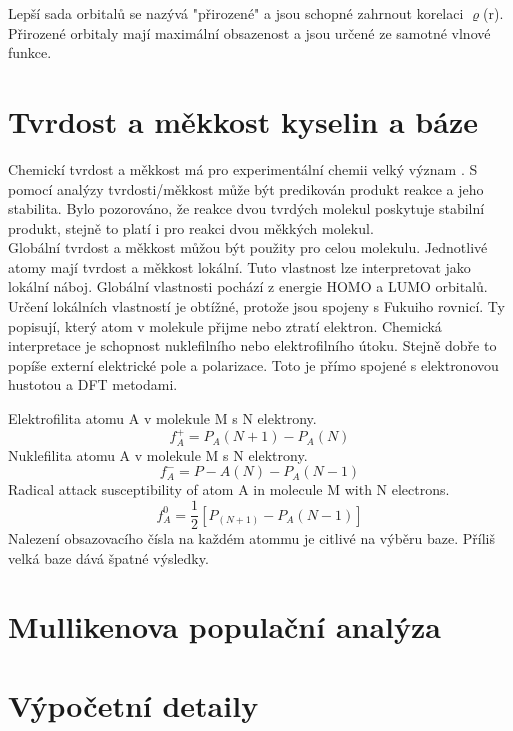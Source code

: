 \documentclass[
  digital, %
  table,   %
  lof,     %
  lot,     %
]{fithesis3}
\begin{document}
Lepší sada orbitalů se nazývá "přirozené" a jsou schopné zahrnout korelaci $\varrho$(r). Přirozené orbitaly mají maximální obsazenost a jsou určené ze samotné vlnové funkce.

\section{Tvrdost a měkkost kyselin a báze}
Chemickí tvrdost a měkkost má pro experimentální chemii velký význam . S pomocí analýzy tvrdosti/měkkost může být predikován produkt reakce a jeho stabilita. Bylo pozorováno, že reakce dvou tvrdých molekul poskytuje stabilní produkt, stejně to platí i pro reakci dvou měkkých molekul. \\
Globální tvrdost a měkkost můžou být použity pro celou molekulu. Jednotlivé atomy mají tvrdost a měkkost lokální. Tuto vlastnost lze interpretovat jako lokální náboj. Globální vlastnosti pochází z energie HOMO a LUMO orbitalů. Určení lokálních vlastností je obtížné, protože jsou spojeny s Fukuiho rovnicí. Ty popisují, který atom v molekule přijme nebo ztratí elektron. Chemická interpretace je schopnost nuklefilního nebo elektrofilního útoku. Stejně dobře to popíše externí elektrické pole a polarizace. Toto je přímo spojené s elektronovou hustotou a DFT metodami.

Elektrofilita atomu A v molekule M s N elektrony.
\begin{equation}
f_A^+ = P_A(N+1) - P_A(N)
\end{equation}
Nuklefilita atomu A v molekule M s N elektrony.
\begin{equation}
f_A^- = P-A(N) - P_A(N-1)
\end{equation}
Radical attack susceptibility of atom A in molecule M with N electrons.
\begin{equation}
f_A^0 = \frac{1}{2}[P_(N+1) - P_A(N-1)]
\end{equation}
Nalezení obsazovacího čísla na každém atommu je citlivé na výběru baze. Příliš velká baze dává špatné výsledky.

\section{Mullikenova populační analýza}

\section{Výpočetní detaily}
\end{document}
